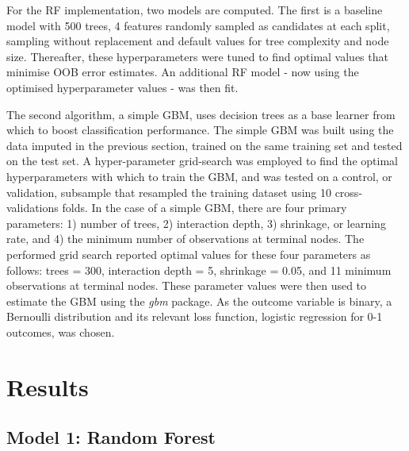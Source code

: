 \documentclass[11pt,preprint, authoryear]{elsarticle}
\numberwithin{equation}{section}
\numberwithin{figure}{section}
\numberwithin{table}{section}
\begin{document}
For the RF implementation, two models are computed. The first is a
baseline model with 500 trees, 4 features randomly sampled as candidates
at each split, sampling without replacement and default values for tree
complexity and node size. Thereafter, these hyperparameters were tuned
to find optimal values that minimise OOB error estimates. An additional
RF model - now using the optimised hyperparameter values - was then fit.

The second algorithm, a simple GBM, uses decision trees as a base
learner from which to boost classification performance. The simple GBM
was built using the data imputed in the previous section, trained on the
same training set and tested on the test set. A hyper-parameter
grid-search was employed to find the optimal hyperparameters with which
to train the GBM, and was tested on a control, or validation, subsample
that resampled the training dataset using 10 cross-validations folds. In
the case of a simple GBM, there are four primary parameters: 1) number
of trees, 2) interaction depth, 3) shrinkage, or learning rate, and 4)
the minimum number of observations at terminal nodes. The performed grid
search reported optimal values for these four parameters as follows:
trees = 300, interaction depth = 5, shrinkage = 0.05, and 11 minimum
observations at terminal nodes. These parameter values were then used to
estimate the GBM using the \emph{gbm} package. As the outcome variable
is binary, a Bernoulli distribution and its relevant loss function,
logistic regression for 0-1 outcomes, was chosen.

\hypertarget{results}{%
\section{Results}\label{results}}

\hypertarget{model-1-random-forest}{%
\subsection{Model 1: Random Forest}\label{model-1-random-forest}}
\end{document}
